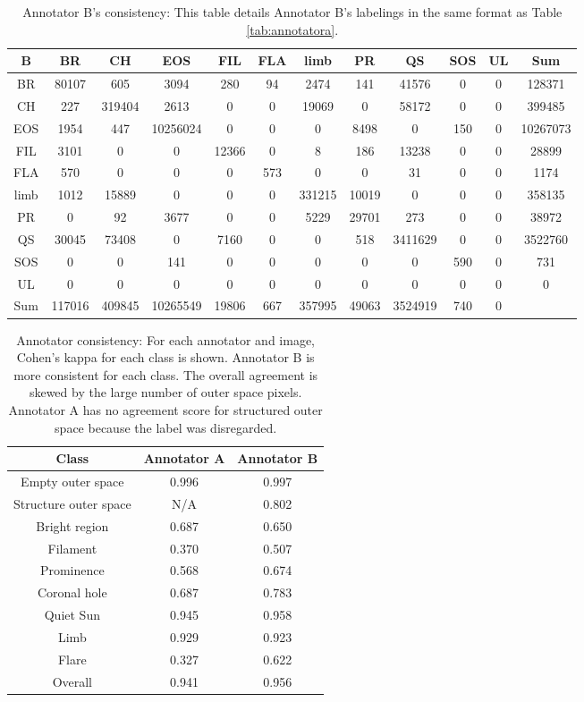 \documentclass[twoside]{report}
\begin{document}
\begin{table}[ht!]
\centering
 \begin{tabular}{|c |c c c c c c c c c c | c|} 
 \hline
\textbf{B} & BR & CH & EOS & FIL & FLA & limb & PR & QS & SOS & UL & Sum \\ \hline
BR & 80107 & 605 & 3094 & 280 & 94 & 2474 & 141 & 41576 & 0 & 0 & 128371\\
CH & 227 & 319404 & 2613 & 0 & 0 & 19069 & 0 & 58172 & 0 & 0 & 399485\\
EOS & 1954 & 447 & 10256024 & 0 & 0 & 0 & 8498 & 0 & 150 & 0 & 10267073\\
FIL & 3101 & 0 & 0 & 12366 & 0 & 8 & 186 & 13238 & 0 & 0 & 28899\\
FLA & 570 & 0 & 0 & 0 & 573 & 0 & 0 & 31 & 0 & 0 & 1174\\
limb & 1012 & 15889 & 0 & 0 & 0 & 331215 & 10019 & 0 & 0 & 0 & 358135\\
PR & 0 & 92 & 3677 & 0 & 0 & 5229 & 29701 & 273 & 0 & 0 & 38972\\
QS & 30045 & 73408 & 0 & 7160 & 0 & 0 & 518 & 3411629 & 0 & 0 & 3522760\\
SOS & 0 & 0 & 141 & 0 & 0 & 0 & 0 & 0 & 590 & 0 & 731\\
UL & 0 & 0 & 0 & 0 & 0 & 0 & 0 & 0 & 0 & 0 & 0\\ \hline
Sum & 117016 & 409845 & 10265549 & 19806 & 667 & 357995 & 49063 & 3524919 & 740 & 0 &\\
 \hline
 \end{tabular}
 \caption{Annotator B's consistency: This table details Annotator B's labelings in the same format as Table \ref{tab:annotatora}.}
 \label{tab:annotatorb}
\end{table}

\begin{table}[ht!]
\centering
 \begin{tabular}{|c c c|} 
 \hline
 Class & Annotator A & Annotator B \\
   \hline\hline
Empty outer space & 0.996 & 0.997 \\
Structure outer space & N/A & 0.802 \\
Bright region & 0.687 & 0.650 \\
Filament & 0.370 & 0.507 \\
Prominence & 0.568 & 0.674 \\
Coronal hole & 0.687 & 0.783 \\ 
Quiet Sun & 0.945 & 0.958 \\
Limb & 0.929 & 0.923 \\
Flare & 0.327 & 0.622 \\ \hline
Overall & 0.941 &  0.956\\
 \hline
 \end{tabular}
 \caption{Annotator consistency: For each annotator and image, Cohen's kappa for each class is shown. Annotator B is more consistent for each class. The overall agreement is skewed by the large number of outer space pixels. Annotator A has no agreement score for structured outer space because the label was disregarded.}
 \label{tab:annotatorconsistency}
\end{table}
\end{document}

